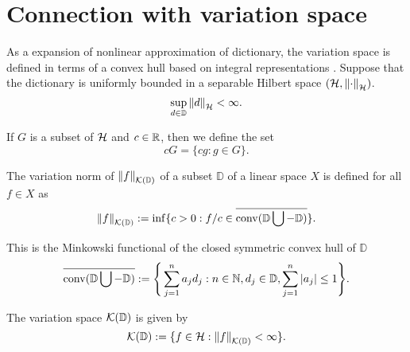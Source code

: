 \section{Connection with variation space}
\label{sec:fourier_variation_space}

As a expansion of nonlinear approximation of dictionary, the variation space is
defined in terms of a convex hull based on integral representations
\citep{parhiBanachSpaceRepresenter2021, parhiWhatKindsFunctions2022}. Suppose
that the dictionary is uniformly bounded in a separable Hilbert space
$(\mathcal{H}, \left\| \cdot \right\|_{\mathcal{H}})$.
\begin{equation}
    \sup_{d\in\mathbb{D}} \left\| d \right\|_{\mathcal{H}} < \infty.
\end{equation}

If $G$ is a subset of $\mathcal{H}$ and $c \in \mathbb{R}$, then we define the set
\begin{equation}
    cG = \{cg: g \in G\}.
\end{equation}

\begin{definition}
    The variation norm of $\left\| {f} \right\|_{\mathcal{K}({\mathbb{D}})}$ of a subset $\mathbb{D}$ of
    a linear space $X$ is defined for all $f \in X$ as
    \begin{equation}
        \left\| {f} \right\|_{\mathcal{K}({\mathbb{D}})} := \inf \{
            c > 0: f/c \in \overline{\operatorname*{conv}(\mathbb{D} \bigcup - \mathbb{D})}
        \}.
    \end{equation}

    This is the Minkowski functional of the closed symmetric convex hull of $\mathbb{D}$
    \begin{equation}
        \overline{\operatorname*{conv}(\mathbb{D} \bigcup - \mathbb{D})} := \Bigg\{ 
            \sum_{j=1}^n a_j d_j: n \in \mathbb{N}, d_j \in \mathbb{D}, 
            \sum_{j=1}^n \left| a_j \right| \leq 1
        \Bigg\}.
    \end{equation}
\end{definition}

\begin{definition}
    The variation space $\mathcal{K}({\mathbb{D}})$ is given by
    \begin{equation}
        \mathcal{K}({\mathbb{D}}) := \{ 
            f \in \mathcal{H}: \left\| {f} \right\|_{\mathcal{K}({\mathbb{D}})} < \infty
        \}.
    \end{equation}
\end{definition}

